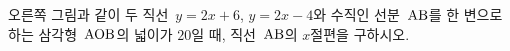 \noindent\begin{minipage}[t]{0.58\linewidth}\vspace{0pt}\raggedright 오른쪽 그림과 같이 두 직선~$y=2x+6$, $y=2x-4$와 수직인 선분~$\mathrm{AB}$를 한 변으로 하는 삼각형~$\mathrm{AOB}$의 넓이가 $20$일 때, 직선~$\mathrm{AB}$의 $x$절편을 구하시오. \end{minipage}\hfill\begin{minipage}[t]{0.4\linewidth}\vspace{0pt}\centering \resizebox{\ifdim\width>\linewidth\linewidth\else\width\fi}{!}{}\end{minipage}\par
